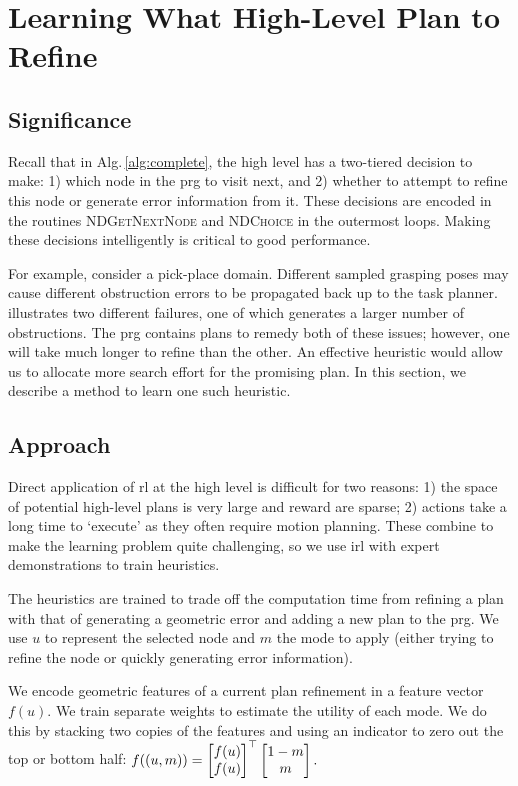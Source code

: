 \section{Learning What High-Level Plan to Refine}
\subsection{Significance}
Recall that in Alg.\,\ref{alg:complete}, the high level has
a two-tiered decision to make: 1) which node in the {\sc prg} to visit
next, and 2) whether to attempt to refine this node or generate
error information from it. These decisions are encoded in the
routines \textsc{NDGetNextNode} and \textsc{NDChoice} in the outermost loops. Making these
decisions intelligently is critical to good performance. 

For example, consider a pick-place domain. Different sampled grasping
poses may cause different obstruction errors to be propagated back up to
the task planner.  illustrates two different
failures, one of which generates a larger number of obstructions. The
{\sc prg} contains plans to remedy both of these issues; however, one
will take much longer to refine than the other. An effective heuristic
would allow us to allocate more search effort for the promising
plan. In this section, we describe a method to learn one such
heuristic.

\subsection{Approach}
Direct application of {\sc rl} at the high level is difficult for two reasons: 1) the
space of potential high-level plans is very large and reward are
sparse; 2) actions take a long time to `execute' as they often require
motion planning. These combine to make the learning problem quite
challenging, so we use {\sc irl} with expert demonstrations to
train heuristics.

The heuristics are trained to trade off the computation time from
refining a plan with that of generating a geometric error and adding a
new plan to the {\sc prg}. We use $u$ to represent the selected node
and $m$ the mode to apply (either trying to refine the node or
quickly generating error information).

We encode geometric features of a current plan refinement in a feature
vector $f(u).$ We train separate weights to estimate the utility of
each mode. We do this by stacking two copies of the features and using
an indicator to zero out the top or bottom half: $f((u, m))
= \begin{bmatrix} f(u) \\ f(u) \end{bmatrix}^\top \begin{bmatrix} 1 -
  m \\ m \end{bmatrix}.\vspace{2pt}$ 

